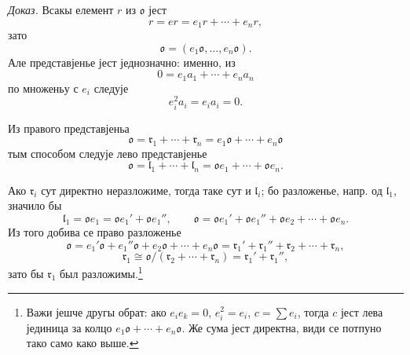 ﻿\documentclass[11pt]{article}
\providecommand{\ml}{\mathfrak{l}}
\providecommand{\mo}{\mathfrak{o}}
\providecommand{\mr}{\mathfrak{r}}
\begin{document}
\emph{Доказ.} Всакы елемент $r$ из $\mo$ јест
\[
        r=er=e_1r+\cdots+e_nr,
\]
зато
\[
        \mo=(e_1\mo,\ldots,e_n\mo).
\]
Але представјенье јест једнозначно: именно, из
\[
        0=e_1a_1+\cdots+e_na_n
\]
по множеньу с $e_i$ следује
\[
        e_i^2a_i=e_i a_i=0.
\]

Из правого представјеньа
\[
        \mo=\mr_1+\cdots+\mr_n=e_1\mo+\cdots+e_n\mo
\]
тым способом следује лево представјенье
\[
        \mo=\ml_1+\cdots+\ml_n=\mo e_1+\cdots+\mo e_n.
\]

Ако $\mr_i$ сут директно неразложиме, тогда таке сут и $\ml_i$; бо разложенье, напр. од $\ml_1$, значило бы
\[
        \ml_1=\mo e_1=\mo e_1'+\mo e_1'',
        \qquad
        \mo=\mo e_1'+\mo e_1''+\mo e_2+\cdots+\mo e_n.
\]
Из того добива се право разложенье
\[
        \mo=e_1'\mo+e_1''\mo+e_2\mo+\cdots+e_n\mo
        =\mr_1'+\mr_1''+\mr_2+\cdots+\mr_n,
\]
\[
        \mr_1\cong \mo/(\mr_2+\cdots+\mr_n)=\mr_1'+\mr_1'',
\]
зато бы $\mr_1$ был разложимы.\footnote{Важи јешче другы обрат: ако $e_i e_k=0$, $e_i^2=e_i$, $c=\sum e_i$, тогда $c$ јест лева јединица за колцо $e_1\mo+\cdots+e_n\mo$. Же сума јест директна, види се потпуно тако само како выше.}
\end{document}
